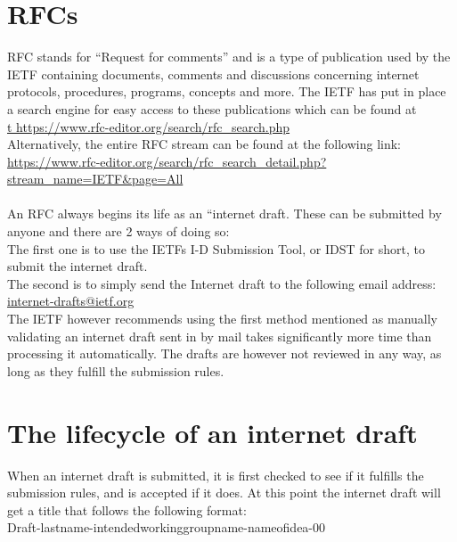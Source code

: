 \documentclass[a4paper,english]{report}
\begin{document}
\section{RFCs}
RFC stands for “Request for comments” and is a type of publication used by the IETF containing documents, comments and discussions concerning internet protocols, procedures, programs, concepts and more. The IETF has put in place a search engine for easy access to these publications which can be found at\\

\url{t https://www.rfc-editor.org/search/rfc_search.php}\\

Alternatively, the entire RFC stream can be found at the following link:\\

\url{https://www.rfc-editor.org/search/rfc_search_detail.php?stream_name=IETF&page=All}\\\\

An RFC always begins its life as an “internet draft. These can be submitted by anyone and there are 2 ways of doing so:\\ The first one is to use the IETFs I-D Submission Tool, or IDST for short, to submit the internet draft.\\The second is to simply send the Internet draft to the following email address:\\

\url{internet-drafts@ietf.org}\\

The IETF however recommends using the first method mentioned as manually validating an  internet draft sent in by mail takes significantly more time than processing it automatically. The drafts are however not reviewed in any way, as long as they fulfill the submission rules.

\section{The lifecycle of an internet draft}
When an internet draft is submitted, it is first checked to see if it fulfills the submission rules, and is accepted if  it does. At this point the internet draft will get a title that follows the following format:\\

Draft-lastname-intendedworkinggroupname-nameofidea-00\\
\end{document}

